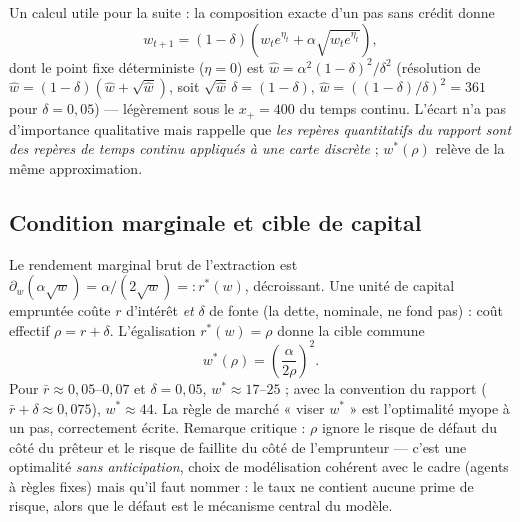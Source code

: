 \documentclass[11pt,a4paper]{article}
\begin{document}
Un calcul utile pour la suite : la composition exacte d'un pas sans crédit
donne
\begin{equation}
\label{eq:map}
w_{t+1} = (1-\delta)\left( w_t e^{\eta_t} + \alpha\sqrt{w_t e^{\eta_t}} \right),
\end{equation}
dont le point fixe déterministe ($\eta = 0$) est
$\hat w = \alpha^2 (1-\delta)^2 / \delta^2$
(résolution de $\hat w = (1-\delta)(\hat w + \sqrt{\hat w})$, soit
$\sqrt{\hat w}\,\delta = (1-\delta)$, $\hat w = ((1-\delta)/\delta)^2 = 361$
pour $\delta = 0{,}05$) — légèrement sous le $x_+ = 400$ du temps continu.
L'écart n'a pas d'importance qualitative mais rappelle que \emph{les repères
quantitatifs du rapport sont des repères de temps continu appliqués à une
carte discrète} ; $w^*(\rho)$ relève de la même approximation.

\subsection{Condition marginale et cible de capital}
Le rendement marginal brut de l'extraction est
$\partial_w(\alpha\sqrt{w}) = \alpha/(2\sqrt{w}) =: r^*(w)$, décroissant.
Une unité de capital empruntée coûte $r$ d'intérêt \emph{et} $\delta$ de
fonte (la dette, nominale, ne fond pas) : coût effectif $\rho = r+\delta$.
L'égalisation $r^*(w) = \rho$ donne la cible commune
\begin{equation}
w^*(\rho) = \left(\frac{\alpha}{2\rho}\right)^2 .
\end{equation}
Pour $\bar r \approx 0{,}05$--$0{,}07$ et $\delta = 0{,}05$,
$w^* \approx 17$--$25$ ; avec la convention du rapport
($\bar r + \delta \approx 0{,}075$), $w^* \approx 44$. La règle de marché
« viser $w^*$ » est l'optimalité myope à un pas, correctement écrite.
Remarque critique : $\rho$ ignore le risque de défaut du côté du prêteur et
le risque de faillite du côté de l'emprunteur — c'est une optimalité
\emph{sans anticipation}, choix de modélisation cohérent avec le cadre
(agents à règles fixes) mais qu'il faut nommer : le taux ne contient aucune
prime de risque, alors que le défaut est le mécanisme central du modèle.
\end{document}
